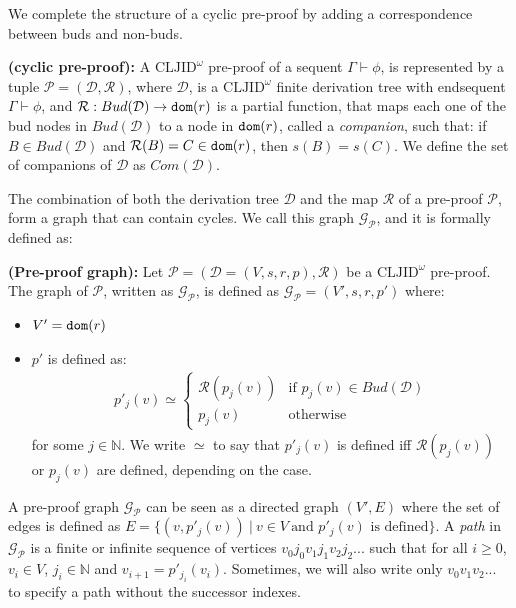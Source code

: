 \documentclass{article}
\begin{document}
We complete the structure of a cyclic pre-proof by adding a correspondence between buds
and non-buds.


\begin{definition}
\label{definition-cyclic pre-proof}
    \textbf{(cyclic pre-proof):} A $\text{CLJID}^{\omega}$ pre-proof of a sequent $\Gamma \vdash \phi$, is represented by a tuple $\mathcal{P} = (\mathcal{D}, \mathcal{R})$, where $\mathcal{D}$, is a $\text{CLJID}^{\omega}$ finite derivation tree with endsequent $\Gamma \vdash \phi$, and $\mathcal{R}: Bud(\mathcal{D}) \rightarrow {\tt dom}(r)$ 
    is a partial function, that maps each one of the bud nodes in $Bud(\mathcal{D})$ 
    to a node in ${\tt dom}(r)$, called a \emph{companion}, such that: 
    if $B \in Bud(\mathcal{D})$ and $\mathcal{R}(B) = C \in {\tt dom}(r)$, 
    then $s(B) = s(C)$. 
    We define the set of companions of $\mathcal{D}$ as $Com(\mathcal{D})$.
\end{definition}


The combination of both the derivation tree $\mathcal{D}$ and the map $\mathcal{R}$ of a pre-proof $\mathcal{P}$, form a graph that can contain cycles. We call this graph $\mathcal{G}_{\mathcal{P}}$, and it is formally defined as:

\begin{definition}
    \textbf{(Pre-proof graph):} Let $\mathcal{P} = (\mathcal{D} = (V, s, r, p), \mathcal{R})$ be a $\text{CLJID}^{\omega}$ pre-proof. The graph of $\mathcal{P}$, written as $\mathcal{G}_{\mathcal{P}}$, is defined as $\mathcal{G}_{\mathcal{P}} = (V', s, r, p')$ where:
    \begin{itemize}
        \item $V' = {\tt dom}(r)$
        \item $p'$ is defined as:
        \begin{align*}
            p'_j(v) \simeq 
            \begin{cases} 
                \mathcal{R}(p_j(v)) & \text{if $p_j(v) \in Bud(\mathcal{D})$} \\
                p_j(v) & \text{otherwise}
            \end{cases}
        \end{align*}
    for some $j \in \mathbb{N}$. We write $\simeq$ to say that $p'_j(v)$ is defined iff $\mathcal{R}(p_j(v))$ or $p_j(v)$ are defined, depending on the case. 
    \end{itemize}
    A pre-proof graph $\mathcal{G}_{\mathcal{P}}$ can be seen as a directed graph $(V', E)$ where the set of edges is defined as $E = \{(v, p'_j(v)) \ | \ v \in V \ \text{and $p'_j(v)$ is defined} \}$. A \emph{path} in $\mathcal{G}_{\mathcal{P}}$ is a finite or infinite sequence of vertices $v_0j_0v_1j_1v_2j_2...$ such that for all $i \geq 0$, $v_i \in V$, $j_i \in \mathbb{N}$ and $v_{i+1} = p'_{j_i}(v_{i})$. Sometimes, we will also write only $v_0v_1v_2...$ to specify a path without the successor indexes.
\end{definition}
\end{document}
